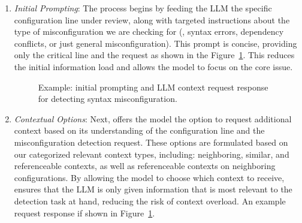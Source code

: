 \begin{enumerate}
    \item \textit{Initial Prompting}: The process begins by feeding the LLM the specific configuration line under review, along with targeted instructions about the type of misconfiguration we are checking for (\eg, syntax errors, dependency conflicts, or just general misconfiguration). This prompt is concise, providing only the critical line and the request as shown in the Figure~\ref{fig:initial_prompt}. This reduces the initial information load and allows the model to focus on the core issue.


    \begin{figure}[t]
    \centering
    \caption{Example: initial prompting and LLM context request response for detecting syntax misconfiguration.}
    \label{fig:initial_prompt}
\end{figure}

    \item \textit{Contextual Options}: Next, \sysname{} offers the model the option to request additional context based on its understanding of the configuration line and the misconfiguration detection request. These options are formulated based on our categorized relevant context types, including: neighboring, similar, and referenceable contexts, as well as referenceable contexts on neighboring configurations. By allowing the model to choose which context to receive, \sysname{} ensures that the LLM is only given information that is most relevant to the detection task at hand, reducing the risk of context overload. An example request response if shown in Figure~\ref{fig:initial_prompt}.
    

\end{enumerate}
